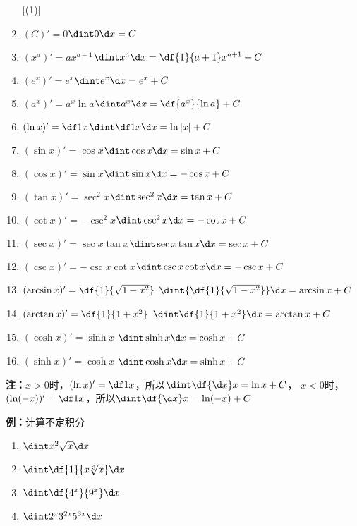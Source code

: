 \begin{thx}
	\begin{enumerate} [(1)]
	  \item $(C)'=0$\hfill  {$\dint 0\d x=C$} 
	  \item $(x^a)'=ax^{a-1}$\hfill  {$\dint x^a\d x=\df{1}{a+1}x^{a+1}+C$}
	  \item $(e^x)'=e^x$\hfill  {$\dint e^x\d x=e^x+C$} 
	  \item $(a^x)'=a^x\ln a$\hfill  {$\dint a^x\d x=\df{a^x}{\ln a}+C$}
	  \item $(\ln x)'=\df 1x$\hfill  {$\dint \df 1x\d x=\ln|x|+C$}
	  \item $(\sin x)'=\cos x$\hfill  {$\dint \cos x\d x=\sin x+C$} 
	  \item $(\cos x)'=\sin x$\hfill  {$\dint \sin x\d x=-\cos x+C$}
	  \item $(\tan x)'=\sec^2 x$\hfill  {$\dint \sec^2 x\d x=\tan x+C$} 
	  \item $(\cot x)'=-\csc^2 x$\hfill  {$\dint \csc^2 x\d x=-\cot x+C$}
	  \item $(\sec x)'=\sec x\tan x$\hfill $\dint\sec x\tan x\d x=\sec x+C$
	  \item $(\csc x)'=-\csc x\cot x$\hfill $\dint\csc x\cot x\d x=-\csc x+C$
	  \item $(\arcsin x)'=\df{1}{\sqrt{1-x^2}}$ \hfill  
	  {$\dint{\df{1}{\sqrt{1-x^2}}}\d x=\arcsin x+C$} 
	  \item $(\arctan x)'=\df{1}{1+x^2}$ \hfill 
	  {$\dint \df{1}{1+x^2}\d x=\arctan x+C$}
	  \item $(\cosh x)'=\sinh x$ \hfill $\dint\sinh x\d x=\cosh x+C$
	  \item $(\sinh x)'=\cosh x$ \hfill $\dint\cosh x\d x=\sinh x+C$
	\end{enumerate}
\end{thx}

{\bf 注：}$x>0$时，$(\ln x)'=\df 1x$，所以$\dint\df{\d x}x=\ln x+C$，
$x<0$时，$(\ln(-x))'=\df1x$，所以$\dint\df{\d x}x=\ln(-x)+C$

{\bf 例：}计算不定积分
\begin{enumerate}[(1)]
  \setlength{\itemindent}{1cm}
  \item $\dint x^2\sqrt{x}\d x$ 
  \item $\dint \df{1}{x\sqrt[3]{x}}\d x$ 
  \item $\dint \df{4^x}{9^x}\d x$ 
  \item $\dint 2^x3^{2x}5^{3x}\d x$
\end{enumerate}


